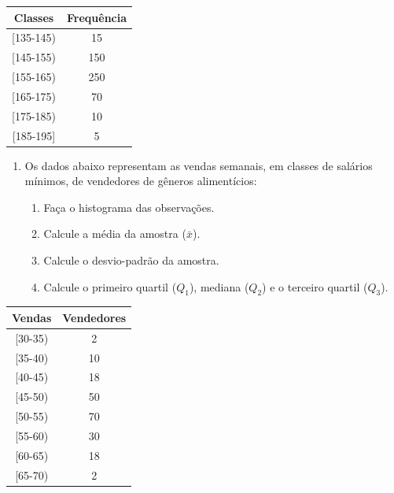 \documentclass[]{article}
\providecommand{\tightlist}{%
  \setlength{\itemsep}{0pt}\setlength{\parskip}{0pt}}
\begin{document}
\begin{table}[H]
\centering
\begin{tabular}{cc}
\hline
Classes     & Frequência \\ \hline
{[}135-145) & 15         \\
{[}145-155) & 150        \\
{[}155-165) & 250        \\
{[}165-175) & 70         \\
{[}175-185) & 10         \\
{[}185-195] & 5          \\ \hline
\end{tabular}
\end{table}

\begin{enumerate}
\def\labelenumi{\arabic{enumi}.}
\setcounter{enumi}{4}
\tightlist
\item
  Os dados abaixo representam as vendas semanais, em classes de salários
  mínimos, de vendedores de gêneros alimentícios:

  \begin{enumerate}
  \def\labelenumii{(\alph{enumii})}
  \tightlist
  \item
    Faça o histograma das observações.
  \item
    Calcule a média da amostra (\(\bar x\)).
  \item
    Calcule o desvio-padrão da amostra.
  \item
    Calcule o primeiro quartil (\(Q_1\)), mediana (\(Q_2\)) e o terceiro
    quartil (\(Q_3\)).
  \end{enumerate}
\end{enumerate}

\begin{table}[H]
\centering
\begin{tabular}{cc}
\hline
Vendas    & Vendedores \\ \hline
{[}30-35) & 2          \\
{[}35-40) & 10         \\
{[}40-45) & 18         \\
{[}45-50) & 50         \\
{[}50-55) & 70         \\
{[}55-60) & 30         \\
{[}60-65) & 18         \\
{[}65-70) & 2          \\ \hline
\end{tabular}
\end{table}
\end{document}
